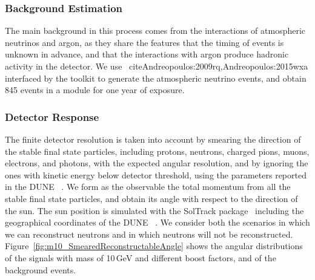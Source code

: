 \subsubsection{Background Estimation}
\label{sec:background}

The main background in this process comes from the  
interactions of atmospheric neutrinos and argon,
as they share the features that the timing of events is unknown in advance,
and that the interactions with argon produce hadronic activity in the detector.
We use ~cite{Andreopoulos:2009rq,Andreopoulos:2015wxa}
interfaced by the  toolkit to generate the  atmospheric
neutrino events, and obtain 845 events in a \nominalmodsize{} module for one year of
exposure.

\subsubsection{Detector Response}
\label{sec:detector_resp}

The finite detector resolution is taken into
account by smearing the direction of the stable final state particles, 
including protons, neutrons, charged pions, muons, electrons, and photons,
with the expected angular resolution,
and by ignoring the ones with kinetic energy below detector threshold,
using the parameters reported in the DUNE ~\cite{Acciarri:2015uup}.
We form as the observable the total momentum from all the stable final state particles,
and obtain its angle with respect to the direction of the sun.
The sun position is simulated with the SolTrack package~\cite{SolTrack}
including the geographical coordinates of the DUNE ~\cite{DUNE_DocDB136}.
We consider both the scenarios in which we can reconstruct neutrons and in which 
neutrons will not be reconstructed.
Figure~\ref{fig:m10_SmearedReconstructableAngle} shows the angular distributions of
the  signals with mass of 10\,GeV and different boost factors,
and of the background events.

